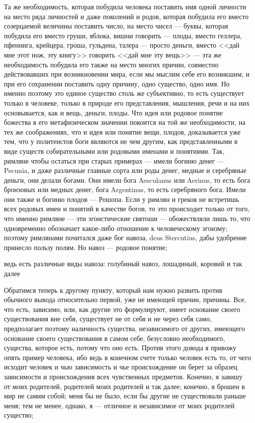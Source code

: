\documentclass[12pt]{article}
\begin{document}
Та же необходимость, которая побудила человека поставить имя одной личности на место ряда личностей и даже поколений и родов, которая побудила его вместо созерцаемой величины поставить число, на место чисел --- буквы, которая побудила его вместо груши, яблока, вишни говорить --- плоды, вместо геллера, пфеннига, крейцера, гроша, гульдена, талера --- просто деньги, вместо <<дай мне этот нож, эту книгу>> говорить <<дай мне эту вещь>>  --- эта же необходимость побудила его также на место многих причин, совместно действовавших при возникновении мира, если мы мыслим себе его возникшим, и при его сохранении поставить одну причину, одно существо, одно имя. Но именно поэтому это единое существо столь же субъективно, то есть существует только в человеке, только в природе его представления, мышления, речи и на них основывается, как и вещь, деньги, плоды. Что идея или родовое понятие божества в его метафизическом значении покоится на той же необходимости, на тех же соображениях, что и идея или понятие вещи, плодов, доказывается уже тем, что у политеистов боги являются не чем другим, как представленными в виде существ собирательными или родовыми именами и понятиями. Так, римляне чтобы остаться при старых примерах --- имели богиню денег --- Pecunia, и даже различные главные сорта или роды денег, медные и серебряные деньги, они делали богами. Они имели бога Aesculanus или Aerinus, то есть бога бронзовых или медных денег, бога Argentinus, то есть серебряного бога. Имели они также и богиню плодов --- Рошопа. Если у римлян и греков не встретишь всех родовых имен и понятий в качестве богов, то это происходит только от того, что именно римляне --- эти эгоистические святоши --- обожествляли лишь то, что одновременно обозначает какое-либо отношение к человеческому эгоизму; поэтому римлянами почитался даже бог навоза, deus Stercutius, дабы удобрение принесло пользу полям. Но навоз --- родовое понятие; 

ведь есть различные виды навоза: голубиный навоз, лошадиный, коровий и так далее 

Обратимся теперь к другому пункту, который нам нужно развить против обычного вывода относительно первой, уже не имеющей причин, причины. Все, что есть, зависимо, или, как другие это формулируют, имеет основание своего существования вне себя, существует не от себя и не через себя само, предполагает поэтому наличность существа, независимого от других, имеющего основание своего существования в самом себе, безусловно необходимого, существа, которое есть, потому что оно есть. Против этого довода я привожу опять пример человека, ибо ведь в конечном счете только человек есть то, от чего исходит человек и чью зависимость и чье происхождение он берет за образец зависимости и происхождения всех чувственных предметов. Конечно, я завишу от моих родителей, родителей моих родителей и так далее; конечно, я брошен в мир не самим собой; меня бы не было, если бы другие не существовали раньше меня; тем не менее, однако, я --- отличное и независимое от моих родителей существо; 
\end{document}
